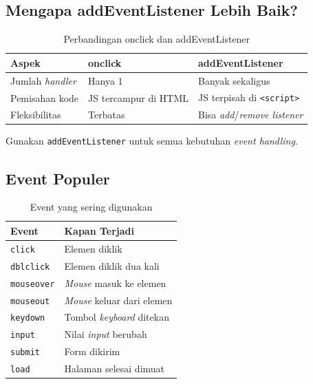 \subsection{Mengapa addEventListener Lebih Baik?}

\begin{table}[htbp]
\centering
\caption{Perbandingan onclick dan addEventListener}
\label{tab:11-perbandingan-event}
\begin{tabular}{lll}
\toprule
\textbf{Aspek} & \textbf{onclick} & \textbf{addEventListener} \\
\midrule
Jumlah \emph{handler} & Hanya 1 & Banyak sekaligus \\
Pemisahan kode & JS tercampur di HTML & JS terpisah di \texttt{<script>} \\
Fleksibilitas & Terbatas & Bisa \emph{add}/\emph{remove listener} \\
\bottomrule
\end{tabular}
\end{table}

\begin{tip}
Gunakan \texttt{addEventListener} untuk semua kebutuhan \emph{event handling}.
\end{tip}

\subsection{Event Populer}

\begin{table}[htbp]
\centering
\caption{Event yang sering digunakan}
\label{tab:11-event-populer}
\begin{tabular}{ll}
\toprule
\textbf{Event} & \textbf{Kapan Terjadi} \\
\midrule
\texttt{click} & Elemen diklik \\
\texttt{dblclick} & Elemen diklik dua kali \\
\texttt{mouseover} & \emph{Mouse} masuk ke elemen \\
\texttt{mouseout} & \emph{Mouse} keluar dari elemen \\
\texttt{keydown} & Tombol \emph{keyboard} ditekan \\
\texttt{input} & Nilai \emph{input} berubah \\
\texttt{submit} & Form dikirim \\
\texttt{load} & Halaman selesai dimuat \\
\bottomrule
\end{tabular}
\end{table}

